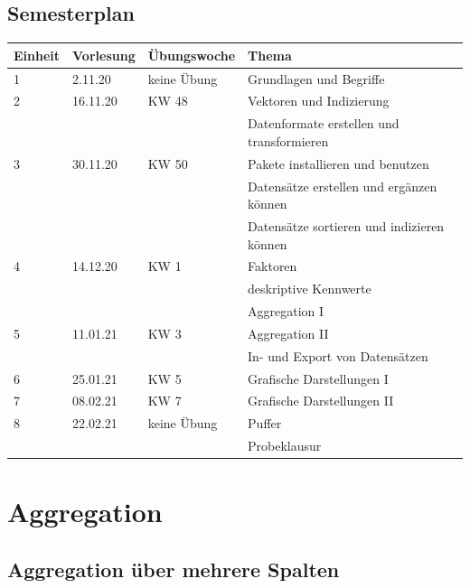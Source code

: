 \documentclass[
]{book}
\begin{document}
\hypertarget{semesterplan-5}{%
\subsection{Semesterplan}\label{semesterplan-5}}

\begin{table}[H]
\centering\begingroup\fontsize{15}{17}\selectfont

\begin{tabular}{l|l|l|l}
\hline
Einheit & Vorlesung & Übungswoche & Thema\\
\hline
1 & 2.11.20 & keine Übung & Grundlagen und Begriffe\\
\hline
2 & 16.11.20 & KW 48 & Vektoren und Indizierung\\
\hline
 &  &  & Datenformate erstellen und transformieren\\
\hline
3 & 30.11.20 & KW 50 & Pakete installieren und benutzen\\
\hline
 &  &  & Datensätze erstellen und ergänzen können\\
\hline
 &  &  & Datensätze sortieren und indizieren können\\
\hline
4 & 14.12.20 & KW 1 & Faktoren\\
\hline
 &  &  & deskriptive Kennwerte\\
\hline
 &  &  & Aggregation I\\
\hline
5 & 11.01.21 & KW 3 & Aggregation II\\
\hline
 &  &  & In- und Export von Datensätzen\\
\hline
6 & 25.01.21 & KW 5 & Grafische Darstellungen I\\
\hline
7 & 08.02.21 & KW 7 & Grafische Darstellungen II\\
\hline
8 & 22.02.21 & keine Übung & Puffer\\
\hline
 &  &  & Probeklausur\\
\hline
\end{tabular}
\endgroup{}
\end{table}

\hypertarget{aggregation}{%
\section{Aggregation}\label{aggregation}}

\hypertarget{aggregation-uxfcber-mehrere-spalten}{%
\subsection{Aggregation über mehrere Spalten}\label{aggregation-uxfcber-mehrere-spalten}}
\end{document}
